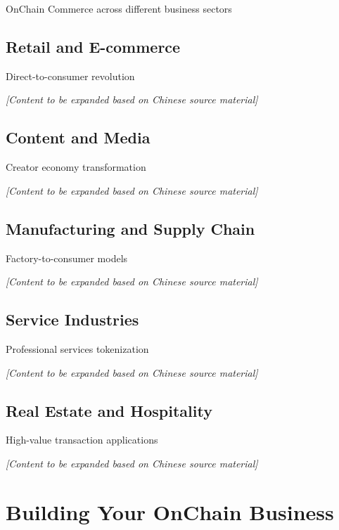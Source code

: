 \documentclass[
  Letterpaper,
]{scrbook}
\begin{document}
OnChain Commerce across different business sectors

\section{Retail and E-commerce}\label{retail-and-e-commerce}

Direct-to-consumer revolution

\emph{{[}Content to be expanded based on Chinese source material{]}}

\section{Content and Media}\label{content-and-media}

Creator economy transformation

\emph{{[}Content to be expanded based on Chinese source material{]}}

\section{Manufacturing and Supply
Chain}\label{manufacturing-and-supply-chain}

Factory-to-consumer models

\emph{{[}Content to be expanded based on Chinese source material{]}}

\section{Service Industries}\label{service-industries}

Professional services tokenization

\emph{{[}Content to be expanded based on Chinese source material{]}}

\section{Real Estate and Hospitality}\label{real-estate-and-hospitality}

High-value transaction applications

\emph{{[}Content to be expanded based on Chinese source material{]}}

\chapter{Building Your OnChain
Business}\label{building-your-onchain-business}
\end{document}
